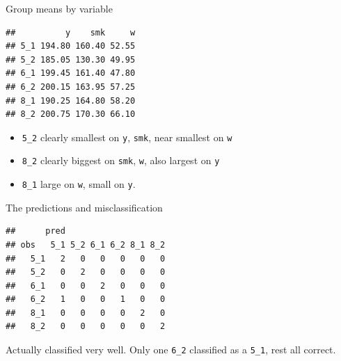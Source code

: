 \documentclass[
  ignorenonframetext,
]{beamer}
\newenvironment{Shaded}{\begin{snugshade}}{\end{snugshade}}
\newcommand{\DataTypeTok}[1]{\textcolor[rgb]{0.13,0.29,0.53}{#1}}
\newcommand{\FloatTok}[1]{\textcolor[rgb]{0.00,0.00,0.81}{#1}}
\newcommand{\KeywordTok}[1]{\textcolor[rgb]{0.13,0.29,0.53}{\textbf{#1}}}
\newcommand{\NormalTok}[1]{#1}
\newcommand{\OperatorTok}[1]{\textcolor[rgb]{0.81,0.36,0.00}{\textbf{#1}}}
\newcommand{\StringTok}[1]{\textcolor[rgb]{0.31,0.60,0.02}{#1}}
\begin{document}
\begin{frame}[fragile]{Group means by variable}
\protect\hypertarget{group-means-by-variable}{}

\begin{Shaded}
\end{Shaded}

\begin{verbatim}
##          y    smk     w
## 5_1 194.80 160.40 52.55
## 5_2 185.05 130.30 49.95
## 6_1 199.45 161.40 47.80
## 6_2 200.15 163.95 57.25
## 8_1 190.25 164.80 58.20
## 8_2 200.75 170.30 66.10
\end{verbatim}

\begin{itemize}
\item
  \texttt{5\_2} clearly smallest on \texttt{y}, \texttt{smk}, near
  smallest on \texttt{w}
\item
  \texttt{8\_2} clearly biggest on \texttt{smk}, \texttt{w}, also
  largest on \texttt{y}
\item
  \texttt{8\_1} large on \texttt{w}, small on \texttt{y}.
\end{itemize}

\end{frame}

\begin{frame}[fragile]{The predictions and misclassification}
\protect\hypertarget{the-predictions-and-misclassification}{}

\begin{Shaded}
\end{Shaded}

\begin{verbatim}
##      pred
## obs   5_1 5_2 6_1 6_2 8_1 8_2
##   5_1   2   0   0   0   0   0
##   5_2   0   2   0   0   0   0
##   6_1   0   0   2   0   0   0
##   6_2   1   0   0   1   0   0
##   8_1   0   0   0   0   2   0
##   8_2   0   0   0   0   0   2
\end{verbatim}

Actually classified very well. Only one \texttt{6\_2} classified as a
\texttt{5\_1}, rest all correct.

\end{frame}
\end{document}
